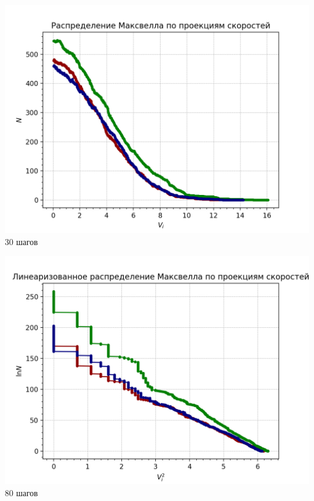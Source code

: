 \begin{minipage}{0.47\textwidth}
    \begin{center}
        \includegraphics[width=\linewidth]{Maxwell_pr.png}\\
        30 шагов
    \end{center}
\end{minipage}
\begin{minipage}{0.47\textwidth}
    \begin{center}
        \includegraphics[width=\linewidth]{Maxwell_pr_lin.png}\\
        80 шагов
    \end{center}
\end{minipage}

